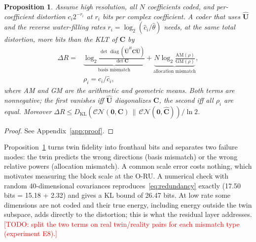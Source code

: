 \documentclass[journal]{IEEEtran}
\newtheorem{proposition}{Proposition}
\newcommand{\todo}[1]{\textcolor{red}{[TODO: #1]}}
\newcommand{\vect}[1]{\mathbf{#1}}
\DeclareMathOperator{\diag}{diag}
\begin{document}
\begin{proposition}\label{prop:redundancy}
Assume high resolution, all $N$ coefficients coded, and per-coefficient distortion $c_i2^{-r_i}$ at $r_i$ bits per complex coefficient. A coder that uses $\hat{\vect{U}}$ and the reverse water-filling rates $r_i=\log_2(\hat c_i/\hat\theta)$ needs, at the same total distortion, more bits than the KLT of $\vect{C}$ by
\begin{equation}\label{eq:redundancy}
\begin{aligned}
\Delta R={}&\underbrace{\log_2\frac{\det\diag(\hat{\vect{U}}^{H}\vect{C}\hat{\vect{U}})}{\det\vect{C}}}_{\text{basis mismatch}}
+\underbrace{N\log_2\frac{\mathrm{AM}(\rho)}{\mathrm{GM}(\rho)}}_{\text{allocation mismatch}},\\
&\rho_i=c_i/\hat c_i,
\end{aligned}
\end{equation}
where AM and GM are the arithmetic and geometric means. Both terms are nonnegative; the first vanishes iff $\hat{\vect{U}}$ diagonalizes $\vect{C}$, the second iff all $\rho_i$ are equal. Moreover $\Delta R\le D_{\mathrm{KL}}(\mathcal{CN}(\vect{0},\vect{C})\,\|\,\mathcal{CN}(\vect{0},\hat{\vect{C}}))/\ln2$.
\end{proposition}
\begin{proof}
See Appendix~\ref{app:proof}.
\end{proof}

Proposition~\ref{prop:redundancy} turns twin fidelity into fronthaul bits and separates two failure modes: the twin predicts the wrong directions (basis mismatch) or the wrong relative powers (allocation mismatch). A common scale error costs nothing, which motivates measuring the block scale at the O-RU. A numerical check with random 40-dimensional covariances reproduces~\eqref{eq:redundancy} exactly (17.50 bits = 15.18 + 2.32) and gives a KL bound of 26.47 bits. At low rate some dimensions are not coded and their true energy, including energy outside the twin subspace, adds directly to the distortion; this is what the residual layer addresses. \todo{split the two terms on real twin/reality pairs for each mismatch type (experiment E8).}
\end{document}
